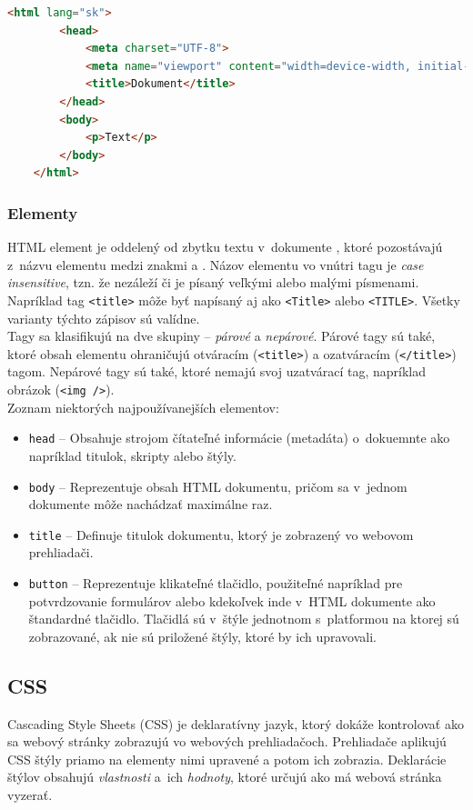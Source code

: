 \begin{lstlisting}[language=HTML, caption=Príklad jednoduchej HTML štruktúry.]
	<html lang="sk">
		<head>
			<meta charset="UTF-8">
			<meta name="viewport" content="width=device-width, initial-scale=1.0">
			<title>Dokument</title>
		</head>
		<body>
			<p>Text</p>
		</body>
	</html>
\end{lstlisting}

\subsubsection{Elementy}
HTML element je oddelený od zbytku textu v~dokumente , ktoré pozostávajú z~názvu elementu medzi znakmi \uv{\texttt{<}} a \uv{\texttt{>}}. Názov elementu vo vnútri tagu je \emph{case insensitive}, tzn. že nezáleží či je písaný veľkými alebo malými písmenami. Napríklad tag \texttt{<title>} môže byť napísaný aj ako \texttt{<Title>} alebo \texttt{<TITLE>}. Všetky varianty týchto zápisov sú valídne. \cite{MDN} \\

\noindent Tagy sa klasifikujú na dve skupiny -- \emph{párové} a \emph{nepárové}. Párové tagy sú také, ktoré obsah elementu ohraničujú otváracím (\texttt{<title>}) a ozatváracím (\texttt{</title>}) tagom. Nepárové tagy sú také, ktoré nemajú svoj uzatvárací tag, napríklad obrázok (\texttt{<img />}). \\

\noindent Zoznam niektorých najpoužívanejších elementov:
\begin{itemize}
	\item \texttt{head} -- Obsahuje strojom čítateľné informácie (metadáta) o~dokuemnte ako napríklad titulok, skripty alebo štýly. \cite{MDN}
	\item \texttt{body} -- Reprezentuje obsah HTML dokumentu, pričom sa v~jednom dokumente môže nachádzať maximálne raz. \cite{MDN}
	\item \texttt{title} -- Definuje titulok dokumentu, ktorý je zobrazený vo webovom prehliadači. \cite{MDN}
	\item \texttt{button} -- Reprezentuje klikateľné tlačidlo, použiteľné napríklad pre potvrdzovanie formulárov alebo kdekoľvek inde v~HTML dokumente ako štandardné tlačidlo. Tlačidlá sú v~štýle jednotnom s~platformou na ktorej sú zobrazované, ak nie sú priložené štýly, ktoré by ich upravovali. \cite{MDN}
\end{itemize}

\subsection{CSS}
Cascading Style Sheets (CSS) je deklaratívny jazyk, ktorý dokáže kontrolovať ako sa webový stránky zobrazujú vo webových prehliadačoch. Prehliadače aplikujú CSS štýly priamo na elementy nimi upravené a potom ich zobrazia. Deklarácie štýlov obsahujú \emph{vlastnosti} a~ich \emph{hodnoty}, ktoré určujú ako má webová stránka vyzerať. \cite{MDN} \\

